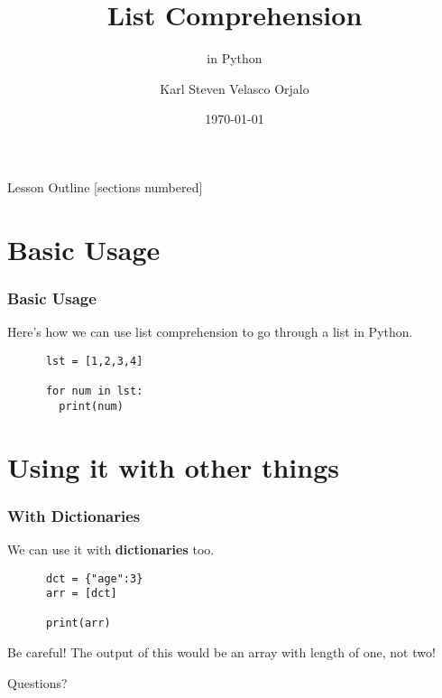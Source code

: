 \documentclass{beamer}
\title{List Comprehension}
\subtitle{in Python}
\date{\today}
\author{Karl Steven Velasco Orjalo}
\institute{Python Quickstart}
\begin{document}
  \maketitle

  \begin{frame}{Lesson Outline}
    [sections numbered]
    \tableofcontents
  \end{frame}

  \section{Basic Usage}
  \begin{frame}[fragile]
    \frametitle{Basic Usage}

    Here's how we can use list comprehension to go through a list in Python.
    \newline
    \begin{verbatim}
      lst = [1,2,3,4]

      for num in lst: 
        print(num)
    \end{verbatim}
  \end{frame}

  \section{Using it with other things}
  \begin{frame}[fragile]
    \frametitle{With Dictionaries}

    We can use it with \textbf{dictionaries} too.
    \newline

    \begin{verbatim}
      dct = {"age":3}
      arr = [dct]

      print(arr)
    \end{verbatim}
    \vspace{0.8cm}
    \begin{block}{Be careful!}
      The output of this would be an array with length of one, not two!
    \end{block}

  \end{frame}
  
  \appendix

  \begin{frame}[standout]
    Questions?
  \end{frame}
\end{document}
